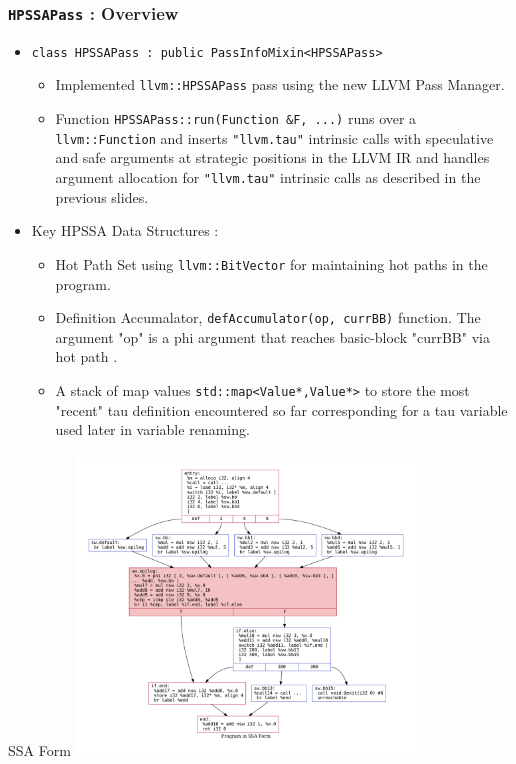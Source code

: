 \documentclass[aspectratio=169, compress]{beamer}
\begin{document}
\begin{frame}
	\frametitle{\texttt{HPSSAPass} : Overview}
	\begin{itemize}
		\item \texttt{class HPSSAPass : public PassInfoMixin<HPSSAPass>}
		\begin{itemize}
			\footnotesize
			\item Implemented \texttt{llvm::HPSSAPass} pass using the new LLVM Pass Manager. 
			\item Function \texttt{HPSSAPass::run(Function &F, ...)}  runs over a \texttt{llvm::Function} and inserts \texttt{"llvm.tau"} intrinsic calls with speculative and safe arguments at strategic positions in the LLVM IR and handles argument allocation for  \texttt{"llvm.tau"} intrinsic calls as described in the previous slides.
		\end{itemize}
		\item Key HPSSA Data Structures :  
		\begin{itemize}
			\footnotesize
			\item Hot Path Set using \texttt{llvm::BitVector} for maintaining \color{red} hot paths \color{black} in the program.
			\item Definition Accumalator, \texttt{defAccumulator(op, currBB)} function. %
			The argument "op" is a phi argument that reaches basic-block "currBB" via \color{red} hot path \color{black}. 
			\item A stack of map values \texttt{std::map<Value*,Value*>} to store the most "recent" tau definition encountered so far corresponding for a tau variable used later in variable renaming. 
		\end{itemize}
	\end{itemize}
\end{frame}

\begin{frame}{SSA Form}
	\centering
	\includegraphics[width=9cm,height=8cm]{baseline.pdf}
\end{frame}
\end{document}
